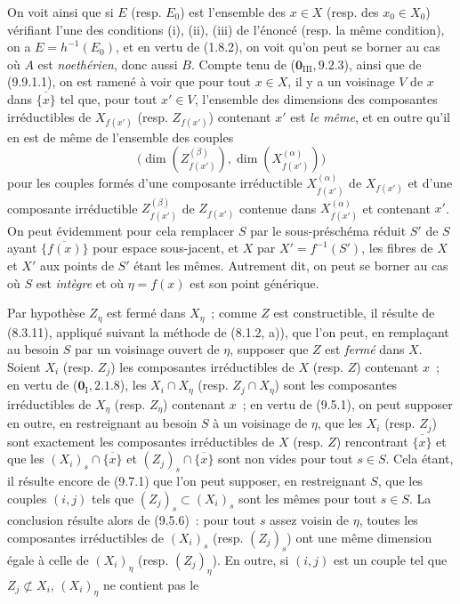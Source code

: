 On voit ainsi que si $E$ (resp. $E_0$) est l'ensemble des $x\in X$ (resp. des
$x_0\in X_0$) vérifiant l'une des conditions (i), (ii), (iii) de l'énoncé
(resp. la même condition), on a $E=h^{-1}(E_0)$, et en vertu de (1.8.2), on
voit qu'on peut se borner au cas où $A$ est \emph{noethérien}, donc aussi $B$.
Compte tenu de ($\mathbf 0_{\mathrm{III}},9.2.3$), ainsi que de (9.9.1.1), on
est ramené à voir que pour tout $x\in X$, il y a un voisinage $V$ de $x$ dans
$\overline{\{x\}}$ tel que, pour tout $x'\in V$, l'ensemble des dimensions des
composantes irréductibles de $X_{f(x')}$ (resp. $Z_{f(x')}$) contenant $x'$ est
\emph{le même}, et en outre qu'il en est de même de l'ensemble des couples
\[
\bigl(\dim(Z_{f(x')}^{(\beta)}),\dim(X_{f(x')}^{(\alpha)})\bigr)
\]
pour les couples formés d'une composante irréductible $X_{f(x')}^{(\alpha)}$
de $X_{f(x')}$ et d'une composante irréductible $Z_{f(x')}^{(\beta)}$ de
$Z_{f(x')}$ contenue dans $X_{f(x')}^{(\alpha)}$ et contenant $x'$. On peut
évidemment pour cela remplacer $S$ par le sous-préschéma réduit $S'$ de $S$
ayant $\overline{\{f(x)\}}$ pour espace sous-jacent, et $X$ par
$X'=f^{-1}(S')$, les fibres de $X$ et $X'$ aux points de $S'$ étant les mêmes.
Autrement dit, on peut se borner au cas où $S$ est \emph{intègre} et où
$\eta=f(x)$ est son point générique.

Par hypothèse $Z_\eta$ est fermé dans $X_\eta$~; comme $Z$ est constructible,
il résulte de (8.3.11), appliqué suivant la méthode de (8.1.2, a)), que l'on
peut, en remplaçant au besoin $S$ par un voisinage ouvert de $\eta$, supposer
que $Z$ est \emph{fermé} dans $X$. Soient $X_i$ (resp. $Z_j$) les composantes
irréductibles de $X$ (resp. $Z$) contenant $x$~; en vertu de
($\mathbf 0_{\mathrm I},2.1.8$), les $X_i\cap X_\eta$ (resp.
$Z_j\cap X_\eta$) sont les composantes irréductibles de $X_\eta$ (resp.
$Z_\eta$) contenant $x$~; en vertu de (9.5.1), on peut supposer en outre, en
restreignant au besoin $S$ à un voisinage de $\eta$, que les $X_i$ (resp.
$Z_j$) sont exactement les composantes irréductibles de $X$ (resp. $Z$)
rencontrant $\overline{\{x\}}$ et que les
$(X_i)_s\cap\overline{\{x\}}$ et $(Z_j)_s\cap\overline{\{x\}}$ sont non vides
pour tout $s\in S$. Cela étant, il résulte encore de (9.7.1) que l'on peut
supposer, en restreignant $S$, que les couples $(i,j)$ tels que
$(Z_j)_s\subset(X_i)_s$ sont les mêmes pour tout $s\in S$. La conclusion
résulte alors de (9.5.6)~: pour tout $s$ assez voisin de $\eta$, toutes les
composantes irréductibles de $(X_i)_s$ (resp. $(Z_j)_s$) ont une même dimension
égale à celle de $(X_i)_\eta$ (resp. $(Z_j)_\eta$). En outre, si $(i,j)$ est un
couple tel que $Z_j\not\subset X_i$, $(X_i)_\eta$ ne contient pas le

